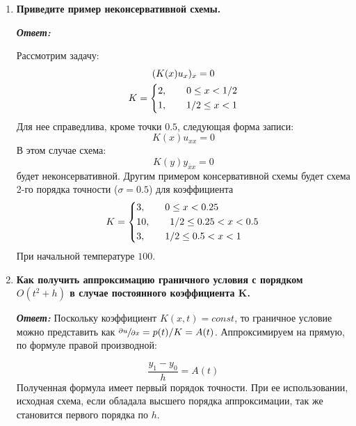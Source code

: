\documentclass[12pt, a4paper]{article}
\begin{document}
	\begin{enumerate}
		\item \textbf{Приведите пример неконсервативной схемы.}
		\vspace*{0.2cm}
		
		\textit{\textbf{Ответ:}}
		
		Рассмотрим задачу: 
		\begin{gather}
			(K(x) u_x)_x = 0 \notag \\
			K = \begin{dcases}
				2, \qquad 0 \le x < 1/2 \\
				1 , \qquad 1/2 \le x < 1 \\
			 \end{dcases}
		\end{gather}
		Для нее справедлива, кроме точки $0.5$, следующая форма записи:
		\[K(x)u_{xx} = 0\]
		В этом случае схема:
		\[
		K(y)y_{\overline{x}x} = 0
		\]
		будет неконсервативной.
		Другим примером консервативной схемы будет схема 2-го порядка точности ($\sigma = 0.5$) для коэффициента
		\begin{gather}
			K = \begin{dcases}
				3, \qquad 0 \le x < 0.25\\
				10 , \qquad 1/2 \le 0.25 < x < 0.5 \\
				3 , \qquad 1/2 \le 0.5 < x < 1 
			\end{dcases} 
		\end{gather}
		При начальной температуре $100$.
		
	
		\item \textbf{Как получить аппроксимацию граничного условия с порядком $O(t^2+h)$ в случае постоянного коэффициента K.}
		\vspace*{0.2cm}
		
		\textit{\textbf{Ответ:}}
		Поскольку коэффициент $K(x, t)=const$, то граничное условие можно представить как $\sfrac{\partial u}{\partial x} = p(t) / K = A(t)$. Аппроксимируем на прямую, по формуле правой производной:
		
		\[
		\dfrac{y_1 - y_0}{h} = A(t)
		\]
		Полученная формула имеет первый порядок точности. При ее использовании, исходная схема, если обладала высшего порядка аппроксимации, так же становится первого порядка по $h$.
	\end{enumerate}
	
\end{document}

